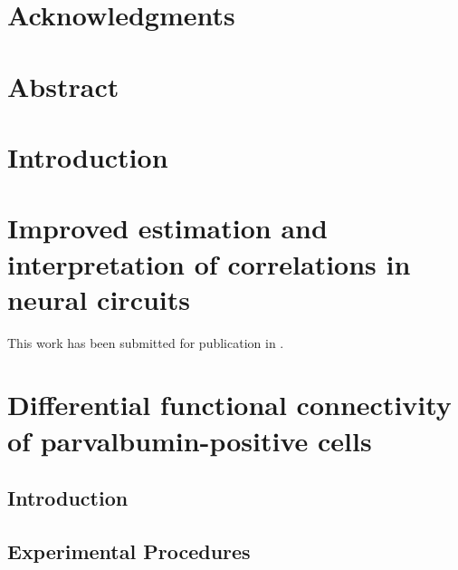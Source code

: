 \documentclass[12pt,letterpaper,titlepage,twoside,openright]{report}
\begin{document}
\chapter*{Acknowledgments}


\chapter*{Abstract}


\tableofcontents

\listoffigures


\chapter{Introduction}
\clearpage 


\chapter{Improved estimation and interpretation of correlations in neural circuits}
This work has been submitted for publication in .
\clearpage









\chapter{Differential functional connectivity of parvalbumin-positive cells}
\clearpage

\section{Introduction}


\section{Experimental Procedures}




\end{document}

